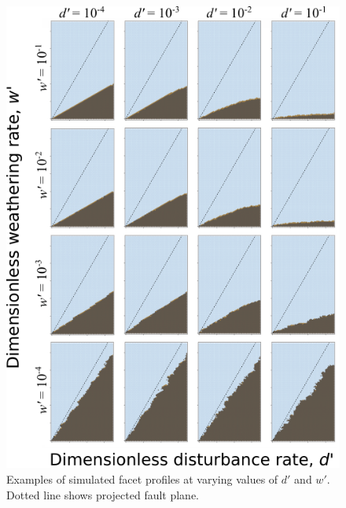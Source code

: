 \begin{figure}[ht!]
\centerline{\includegraphics{Figures/four_by_four_profiles_in_d-w_space.pdf}}
\caption{Examples of simulated facet profiles at varying values of $d'$ and $w'$. Dotted line shows projected fault plane.}
\label{fig:dwprofiles}
\end{figure}

